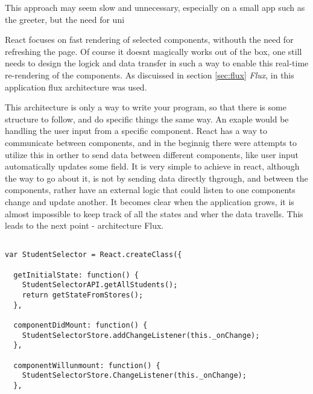 This approach may seem slow and unnecessary, especially on a small app such as the greeter, but the need for uni



React focuses on fast rendering of selected components, withouth the need for refreshing the page. Of course it doesnt magically works out of the box, one still needs to design the logick and data transfer in such a way to enable this real-time re-rendering of the components. As discuissed in section \ref{sec:flux} \emph{Flux}, in this application flux architecture was used. 



This architecture is only a way to write your program, so that there is some structure to follow, and do specific things the same way. An exaple would be handling the user input from a specific component. React has a way to communicate between components, and in the beginnig there were attempts to utilize this in orther to send data between different components, like user input automatically updates some field. It is very simple to achieve in react, although the way to go about it, is not by sending data directly thgrough, and between the components, rather have an external logic that could listen to one components change and update another. It becomes clear when the application grows, it is almost impossible to keep track of all the states and wher the data travells. This leads to the next point - architecture Flux.


\begin{lstlisting}[caption=React setup for listening to cache/data store, label=lst:componentlisteners]

var StudentSelector = React.createClass({

  getInitialState: function() {
    StudentSelectorAPI.getAllStudents();
    return getStateFromStores();
  },

  componentDidMount: function() {
    StudentSelectorStore.addChangeListener(this._onChange);
  },

  componentWillunmount: function() {
    StudentSelectorStore.ChangeListener(this._onChange);
  },

\end{lstlisting}

